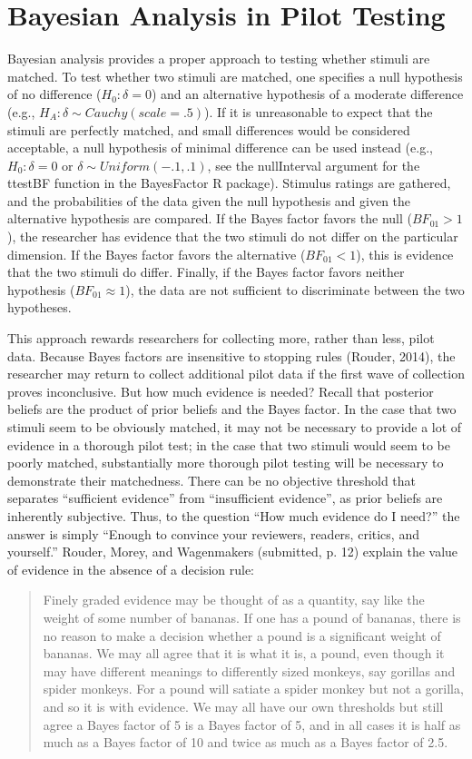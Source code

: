 \documentclass[fignum,nobf,man]{apa}
\begin{document}
\section{Bayesian Analysis in Pilot Testing}
Bayesian analysis provides a proper approach to testing whether stimuli are matched. To test whether two stimuli are matched, one specifies a null hypothesis of no difference ($H_0: \delta{} = 0$) and an alternative hypothesis of a moderate difference (e.g., $H_A: \delta{} \sim{} Cauchy(scale = .5)$). If it is unreasonable to expect that the stimuli are perfectly matched, and small differences would be considered acceptable, a null hypothesis of minimal difference can be used instead (e.g., $H_0: \delta{} = 0$ or $\delta{} \sim{} Uniform(-.1, .1)$, see the nullInterval argument for the ttestBF function in the BayesFactor R package). Stimulus ratings are gathered, and the probabilities of the data given the null hypothesis and given the alternative hypothesis are compared. If the Bayes factor favors the null ($BF_{01} > 1$), the researcher has evidence that the two stimuli do not differ on the particular dimension. If the Bayes factor favors the alternative ($BF_{01} < 1$), this is evidence that the two stimuli do differ. Finally, if the Bayes factor favors neither hypothesis ($BF_{01} \approx 1$), the data are not sufficient to discriminate between the two hypotheses.
 
This approach rewards researchers for collecting more, rather than less, pilot data. Because Bayes factors are insensitive to stopping rules (Rouder, 2014), the researcher may return to collect additional pilot data if the first wave of collection proves inconclusive. But how much evidence is needed? Recall that posterior beliefs are the product of prior beliefs and the Bayes factor. In the case that two stimuli seem to be obviously matched, it may not be necessary to provide a lot of evidence in a thorough pilot test; in the case that two stimuli would seem to be poorly matched, substantially more thorough pilot testing will be necessary to demonstrate their matchedness.  There can be no objective threshold that separates ``sufficient evidence'' from ``insufficient evidence'', as prior beliefs are inherently subjective. %
Thus, to the question ``How much evidence do I need?'' the answer is simply ``Enough to convince your reviewers, readers, critics, and yourself.'' Rouder, Morey, and Wagenmakers (submitted, p. 12) explain the value of evidence in the absence of a decision rule: 
\begin{quote}
Finely graded evidence may be thought of as a quantity, say like the weight of some number of bananas. If one has a pound of bananas, there is no reason to make a decision whether a pound is a significant weight of bananas. We may all agree that it is what it is, a pound, even though it may have different meanings to differently sized monkeys, say gorillas and spider monkeys. For a pound will satiate a spider monkey but not a gorilla, and so it is with evidence. We may all have our own thresholds but still agree a Bayes factor of 5 is a Bayes factor of 5, and in all cases it is half as much as a Bayes factor of 10 and twice as much as a Bayes factor of 2.5.
\end{quote}
\end{document}
